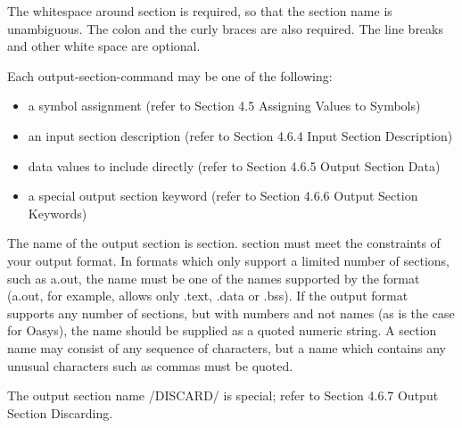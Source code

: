 The whitespace around section is required, so that the section name is
unambiguous. The colon and the curly braces are also required. The line breaks
and other white space are optional.

Each output-section-command may be one of the following:

\begin{itemize}
  \item 
a symbol assignment (refer to Section 4.5 Assigning Values to Symbols)
  \item 
an input section description (refer to Section 4.6.4 Input Section Description)
  \item 
data values to include directly (refer to Section 4.6.5 Output Section Data)
  \item 
a special output section keyword (refer to Section 4.6.6 Output Section Keywords)
\end{itemize}


The name of the output section is section. section must meet the constraints of
your output format. In formats which only support a limited number of sections,
such as a.out, the name must be one of the names supported by the format (a.out,
for example, allows only .text, .data or .bss). If the output format supports
any number of sections, but with numbers and not names (as is the case for
Oasys), the name should be supplied as a quoted numeric string. A section name
may consist of any sequence of characters, but a name which contains any unusual
characters such as commas must be quoted.

The output section name /DISCARD/ is special; refer to Section 4.6.7 Output
Section Discarding.



\secup
